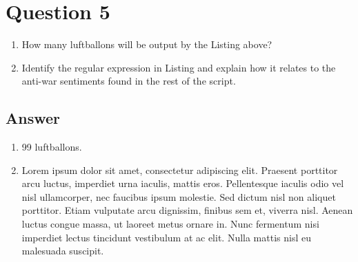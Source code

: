\documentclass[
	12pt, %
]{fphw}
\begin{document}
\section*{Question 5}
\begin{problem}
	
	
	\begin{enumerate}
		\item How many luftballons will be output by the Listing above?
		\item Identify the regular expression in Listing  and explain how it relates to the anti-war sentiments found in the rest of the script.
	\end{enumerate}

\end{problem}


\subsection*{Answer}

\begin{enumerate}
	\item 99 luftballons.
	\item Lorem ipsum dolor sit amet, consectetur adipiscing elit. Praesent porttitor arcu luctus, imperdiet urna iaculis, mattis eros. Pellentesque iaculis odio vel nisl ullamcorper, nec faucibus ipsum molestie. Sed dictum nisl non aliquet porttitor. Etiam vulputate arcu dignissim, finibus sem et, viverra nisl. Aenean luctus congue massa, ut laoreet metus ornare in. Nunc fermentum nisi imperdiet lectus tincidunt vestibulum at ac elit. Nulla mattis nisl eu malesuada suscipit.
\end{enumerate}

\end{document}
